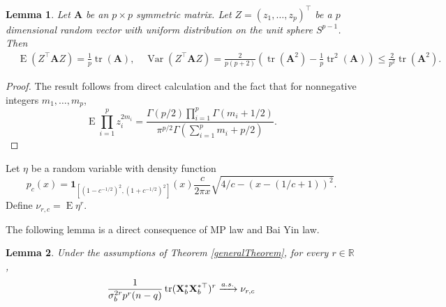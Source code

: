 \documentclass[11pt]{article}
\DeclareMathOperator{\mytr}{tr}
\DeclareMathOperator{\myE}{E}
\DeclareMathOperator{\myVar}{Var}
\newcommand{\BA}{\mathbf{A}}    \newcommand{\BB}{\mathbf{B}}    \newcommand{\BC}{\mathbf{C}}    \newcommand{\BD}{\mathbf{D}}    \newcommand{\BE}{\mathbf{E}}    \newcommand{\BF}{\mathbf{F}}    \newcommand{\BG}{\mathbf{G}}    \newcommand{\BH}{\mathbf{H}}    \newcommand{\BI}{\mathbf{I}}    \newcommand{\BJ}{\mathbf{J}}    \newcommand{\BK}{\mathbf{K}}    \newcommand{\BL}{\mathbf{L}}
\theoremstyle{plain}
\newtheorem{lemma}{\quad\quad Lemma}
\theoremstyle{definition}
\theoremstyle{remark}
\begin{document}
\begin{appendices}
\begin{lemma}\label{lemma:uniform}
    Let $\BA$ be an $p\times p$ symmetric matrix.
    Let $Z=(z_1,\ldots,z_p)^\top$ be a $p$ dimensional random vector with uniform distribution on the unit sphere $ S^{p-1}$.
    Then 
    \begin{equation*}
        \begin{split}
            &\myE (Z^\top \BA Z) = \frac{1}{p} \mytr (\BA),
        \quad
        \myVar (Z^\top \BA Z) =
        \frac{2}{p(p+2)}\left( \mytr (\BA^2) - \frac{1}{p} \mytr^2 (\BA) \right)
        \leq
        \frac{2}{p^2} \mytr (\BA^2)  
        .
        \end{split}
    \end{equation*}
\end{lemma}
\begin{proof}
    The result follows from direct calculation and the fact that for nonnegative integers $m_1,\ldots, m_{p}$,
\begin{equation*}
    \myE \prod_{i=1}^p z_i^{2 m_i} 
    =
    \frac{\Gamma(p/2) \prod_{i=1}^p \Gamma(m_i+1/2)}{ \pi^{p/2} \Gamma(\sum_{i=1}^p m_i + p/2)}
    .
\end{equation*}
\end{proof}


        
Let $\eta$ be a random variable with density function
    \begin{equation*}
        p_{c}(x)=\mathbf{1}_{\left[(1-c^{-1/2})^2,(1+c^{-1/2})^2\right]}(x)
        \frac{c}{2\pi x} \sqrt{4/c - \left(x-(1/c+1)\right)^2}.
    \end{equation*}
Define $
        \nu_{r,c}
        =
        \myE \eta^r
        $.

The following lemma is a direct consequence of MP law and Bai Yin law.
\begin{lemma}\label{lemma:MP}
    Under the assumptions of Theorem \ref{generalTheorem}, for every $r\in \mathbb R$,
    \begin{equation*}
        \frac{1}{\sigma_b^{2r} p^r (n-q)}\mytr (\BX_b^* \BX_b^{*\top})^{r} 
        \xrightarrow{a.s.}
        \nu_{r,c}
    \end{equation*}
\end{lemma}




 



\end{appendices}





\end{document}
